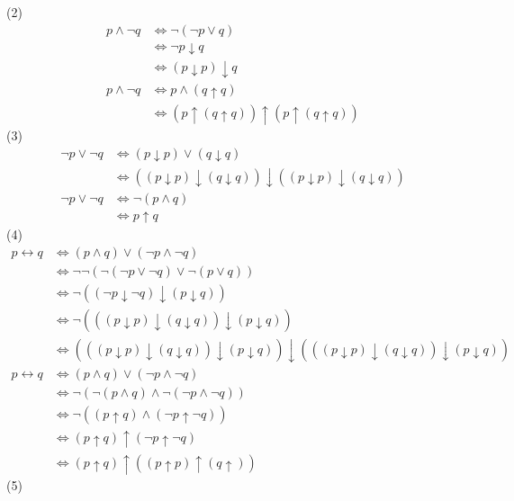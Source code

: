 \documentclass{article}
\begin{document}
(2)
\[
\begin{aligned}
p \wedge \neg q & \iff \neg (\neg p \vee q) \\
                & \iff \neg p \downarrow q \\
                & \iff (p \downarrow p) \downarrow q \\
p \wedge \neg q & \iff p \wedge (q \uparrow q) \\
                & \iff (p \uparrow (q \uparrow q)) \uparrow (p \uparrow (q \uparrow q))
\end{aligned}    
\]
(3)
\[
\begin{aligned}
\neg p \vee \neg q & \iff (p \downarrow p) \vee (q \downarrow q) \\
                   & \iff ((p \downarrow p) \downarrow (q \downarrow q)) \downarrow ((p \downarrow p) \downarrow (q \downarrow q)) \\
\neg p \vee \neg q & \iff \neg (p \wedge q) \\
                   & \iff p \uparrow q
\end{aligned}    
\]
(4)
\[
\begin{aligned}
p \leftrightarrow q & \iff (p \wedge q) \vee (\neg p \wedge \neg q) \\
                    & \iff \neg \neg (\neg (\neg p \vee \neg q) \vee \neg (p \vee q)) \\
                    & \iff \neg ((\neg p \downarrow \neg q) \downarrow (p \downarrow q)) \\
                    & \iff \neg (((p \downarrow p) \downarrow (q \downarrow q)) \downarrow (p \downarrow q)) \\
                    & \iff (((p \downarrow p) \downarrow (q \downarrow q)) \downarrow (p \downarrow q)) \downarrow (((p \downarrow p) \downarrow (q \downarrow q)) \downarrow (p \downarrow q)) \\
p \leftrightarrow q & \iff (p \wedge q) \vee (\neg p \wedge \neg q) \\
                    & \iff \neg (\neg (p \wedge q) \wedge \neg (\neg p \wedge \neg q)) \\
                    & \iff \neg ((p \uparrow q) \wedge (\neg p \uparrow \neg q)) \\
                    & \iff (p \uparrow q) \uparrow (\neg p \uparrow \neg q) \\
                    & \iff (p \uparrow q) \uparrow ((p \uparrow p) \uparrow (q \uparrow )) 
\end{aligned}    
\]
(5)
\end{document}
